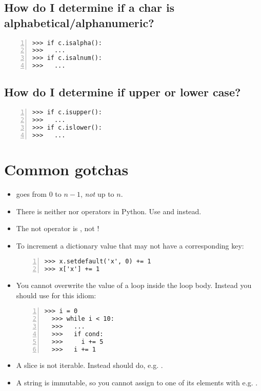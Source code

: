 \documentclass[12pt]{article}
\begin{document}
\subsection{How do I determine if a char is alphabetical/alphanumeric?}
\begin{lstlisting}[numbers=left]
>>> if c.isalpha():
>>>   ...
>>> if c.isalnum():
>>>   ...
\end{lstlisting}

\subsection{How do I determine if upper or lower case?}
\begin{lstlisting}[numbers=left]
>>> if c.isupper():
>>>   ...
>>> if c.islower():
>>>   ...
\end{lstlisting}

\section{Common gotchas}
\begin{itemize}
\item {} goes from $0$ to $n-1$, \emph{not} up to $n$.
\item There is neither \python{++} nor \python{--} operators in Python. Use  and  instead.
\item The not operator is , not !
\item To increment a dictionary value that may not have a corresponding key:

\begin{lstlisting}[numbers=left]
>>> x.setdefault('x', 0) += 1
>>> x['x'] += 1
\end{lstlisting}
\item You cannot overwrite the value of a  loop inside the loop body. Instead you should use  for this idiom:

\begin{lstlisting}[numbers=left]
  >>> i = 0
  >>> while i < 10:
  >>>   ...
  >>>   if cond:
  >>>     i += 5
  >>>   i += 1
  \end{lstlisting}
\item A slice is not iterable. Instead should do, e.g. .
\item A string is immutable, so you cannot assign to one of its elements with e.g. .
\end{itemize}

%
%
\end{document}
